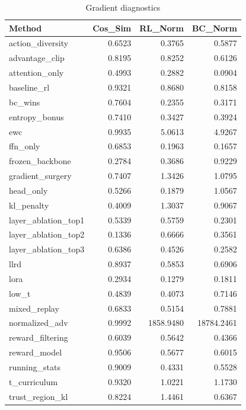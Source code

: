 \begin{table}[htbp]
\centering
\caption{Gradient diagnostics}
\label{tab:grad-diag}
\begin{tabular}{lrrr}
\toprule
\textbf{Method} & \textbf{Cos\_Sim} & \textbf{RL\_Norm} & \textbf{BC\_Norm} \\
\midrule
action\_diversity & 0.6523 & 0.3765 & 0.5877 \\
advantage\_clip & 0.8195 & 0.8252 & 0.6126 \\
attention\_only & 0.4993 & 0.2882 & 0.0904 \\
baseline\_rl & 0.9321 & 0.8680 & 0.8158 \\
bc\_wins & 0.7604 & 0.2355 & 0.3171 \\
entropy\_bonus & 0.7410 & 0.3427 & 0.3924 \\
ewc & 0.9935 & 5.0613 & 4.9267 \\
ffn\_only & 0.6853 & 0.1963 & 0.1657 \\
frozen\_backbone & 0.2784 & 0.3686 & 0.9229 \\
gradient\_surgery & 0.7407 & 1.3426 & 1.0795 \\
head\_only & 0.5266 & 0.1879 & 1.0567 \\
kl\_penalty & 0.4009 & 1.3037 & 0.9067 \\
layer\_ablation\_top1 & 0.5339 & 0.5759 & 0.2301 \\
layer\_ablation\_top2 & 0.1336 & 0.6666 & 0.3561 \\
layer\_ablation\_top3 & 0.6386 & 0.4526 & 0.2582 \\
llrd & 0.8937 & 0.5853 & 0.6906 \\
lora & 0.2934 & 0.1279 & 0.1811 \\
low\_t & 0.4839 & 0.4073 & 0.7146 \\
mixed\_replay & 0.6833 & 0.5154 & 0.7881 \\
normalized\_adv & 0.9992 & 1858.9480 & 18784.2461 \\
reward\_filtering & 0.6039 & 0.5642 & 0.4366 \\
reward\_model & 0.9506 & 0.5677 & 0.6015 \\
running\_stats & 0.9009 & 0.4331 & 0.5528 \\
t\_curriculum & 0.9320 & 1.0221 & 1.1730 \\
trust\_region\_kl & 0.8224 & 1.4461 & 0.6367 \\
\bottomrule
\end{tabular}
\end{table}